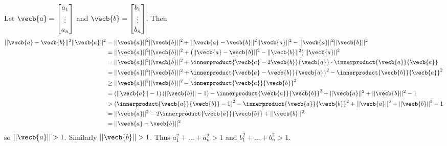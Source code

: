 Let $\vecb{a}=\begin{bmatrix} a_1 \\ \vdots \\ a_n \end{bmatrix}$ and $\vecb{b}=\begin{bmatrix} b_1 \\ \vdots \\ b_n \end{bmatrix}$. Then
\begin{align*}
	||\vecb{a}-\vecb{b}||^2||\vecb{a}||^2&=||\vecb{a}||^2||\vecb{b}||^2+||\vecb{a}-\vecb{b}||^2||\vecb{a}||^2-||\vecb{a}||^2||\vecb{b}||^2\\
	&=||\vecb{a}||^2||\vecb{b}||^2+\left(||\vecb{a}-\vecb{b}||^2-||\vecb{b}||^2\right)||\vecb{a}||^2\\
	&=||\vecb{a}||^2||\vecb{b}||^2+\innerproduct{\vecb{a}-2\vecb{b}}{\vecb{a}}\cdot\innerproduct{\vecb{a}}{\vecb{a}}\\
	&=||\vecb{a}||^2||\vecb{b}||^2+\innerproduct{\vecb{a}-\vecb{b}}{\vecb{a}}^2-\innerproduct{\vecb{b}}{\vecb{a}}^2\\
	&\geq||\vecb{a}||^2||\vecb{b}||^2-\innerproduct{\vecb{a}}{\vecb{b}}^2\\
	&=\left(||\vecb{a}||-1\right)\left(||\vecb{b}||-1\right)-\innerproduct{\vecb{a}}{\vecb{b}}^2+||\vecb{a}||^2+||\vecb{b}||^2-1\\
	&>\left(\innerproduct{\vecb{a}}{\vecb{b}}-1\right)^2-\innerproduct{\vecb{a}}{\vecb{b}}^2+||\vecb{a}||^2+||\vecb{b}||^2-1\\
	&=||\vecb{a}||^2-2\innerproduct{\vecb{a}}{\vecb{b}}+||\vecb{b}||^2\\
	&=||\vecb{a}-\vecb{b}||^2
\end{align*}
so $||\vecb{a}||>1$. Similarly $||\vecb{b}||>1$. Thus $a_1^2+\ldots+a_n^2>1$ and $b_1^2+\ldots+b_n^2>1$.
